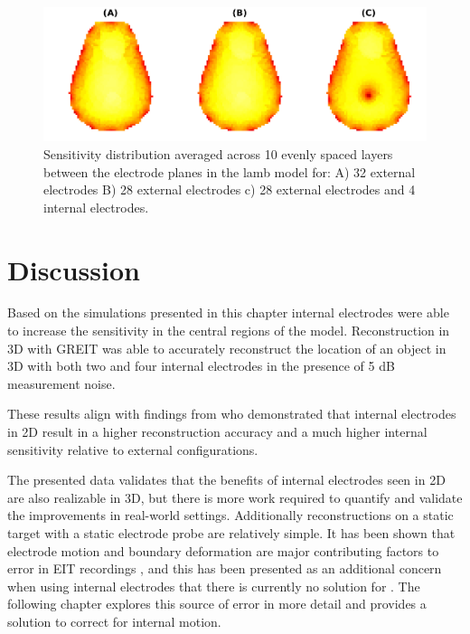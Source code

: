 \begin{figure}
\centering
\includegraphics[width=\columnwidth]{chapter6-internal_electrodes/imgs/lamb_sensitivity_profiles.pdf}
\caption[Sensitivity distribution in a lamb model]{\label{fig:sens_example}%
Sensitivity distribution averaged across 10 evenly spaced layers
between the electrode planes in the lamb model for: 
A) 32 external electrodes 
B) 28 external electrodes 
c) 28 external electrodes and 4 internal electrodes.
}
\end{figure}

\section{Discussion}

Based on the simulations presented in this chapter 
internal electrodes were able to increase the sensitivity in 
the central regions of the model. 
Reconstruction in 3D with GREIT was able to accurately 
reconstruct the location of an object in 3D with both 
two and four internal electrodes in the presence of 5 dB 
measurement noise. 

These results align with findings 
from 
who demonstrated that internal electrodes in 2D 
result in a higher reconstruction accuracy and 
a much higher internal sensitivity relative to external configurations.

The presented data validates that the benefits of internal electrodes seen in 2D
are also realizable in 3D, but there is more 
work required to quantify and validate the improvements in real-world settings. 
Additionally reconstructions on a static target with a static electrode probe
are relatively simple. It has been shown that electrode motion and boundary
deformation are major contributing factors to error in EIT 
recordings \parencite{boyle_impact_2011,grychtol_impact_2012}, and this 
has been presented as an additional concern when using internal electrodes
that there is currently no solution for \parencite{nguyen_electrical_2020}.
The following chapter explores this source of error in more detail and 
provides a solution to correct for internal motion.

